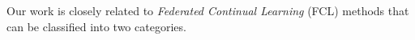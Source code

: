 


Our work is closely related to \textit{Federated Continual Learning} (FCL) methods that can be classified into two categories. 


